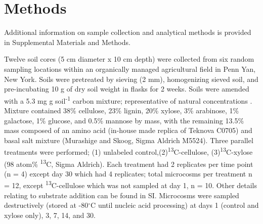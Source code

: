 \section{Methods}
Additional information on sample collection and analytical methods is provided
in Supplemental Materials and Methods.

Twelve soil cores (5 cm diameter x 10 cm depth) were collected from six random
sampling locations within an organically managed agricultural field in Penn
Yan, New York. Soils were pretreated by sieving (2 mm), homogenizing sieved
soil, and pre-incubating 10 g of dry soil weight in flasks for 2 weeks. Soils
were amended with a 5.3 mg g soil\textsuperscript{-1} carbon mixture;
representative of natural concentrations \cite{Schneckenberger_2008}. Mixture
contained 38\% cellulose, 23\% lignin, 20\% xylose, 3\% arabinose, 1\%
galactose, 1\% glucose, and 0.5\% mannose by mass, with the remaining 13.5\%
mass composed of an amino acid (in-house made replica of Teknova C0705) and
basal salt mixture (Murashige and Skoog, Sigma Aldrich M5524). Three parallel
treatments were performed; (1) unlabeled
control,(2)\textsuperscript{13}C-cellulose, (3)\textsuperscript{13}C-xylose (98
atom\% \textsuperscript{13}C, Sigma Aldrich). Each treatment had 2 replicates
per time point (n = 4) except day 30 which had 4 replicates; total microcosms
per treatment n = 12, except \textsuperscript{13}C-cellulose which was not
sampled at day 1, n = 10. Other details relating to substrate addition can be
found in SI. Microcosms were sampled destructively (stored at -80$^{\circ}$C
until nucleic acid processing) at days 1 (control and xylose only), 3, 7, 14,
and 30.


